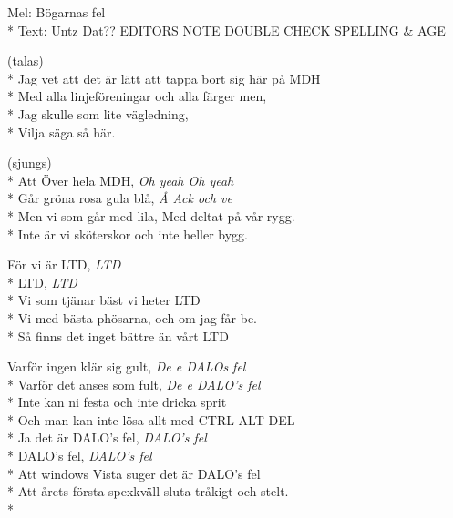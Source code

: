 \begin{SongText}
    \begin{SongInfo}
        Mel: Bögarnas fel\\*%
        Text: Untz Dat?? EDITORS NOTE DOUBLE CHECK SPELLING \& AGE
    \end{SongInfo}
    \begin{SongVerse}
        (talas)\\*%
        Jag vet att det är lätt att tappa bort sig här på MDH\\*%
        Med alla linjeföreningar och alla färger men, \\*%
        Jag skulle som lite vägledning, \\*%
        Vilja säga så här.
    \end{SongVerse}
    \begin{SongVerse}
        (sjungs)\\*%
        Att Över hela MDH, \textit{Oh yeah Oh yeah}\\*%
        Går gröna rosa gula blå, \textit{Å Ack och ve}\\*%
        Men vi som går med lila, Med deltat på vår rygg.\\*%
        Inte är vi sköterskor och inte heller bygg.
    \end{SongVerse}
    \begin{SongVerse}
        För vi är LTD, \textit{LTD}\\*%
        LTD, \textit{LTD}\\*%
        Vi som tjänar bäst vi heter LTD\\*%
        Vi med bästa phösarna, och om jag får be.\\*%
        Så finns det inget bättre än vårt LTD
    \end{SongVerse}
    \begin{SongVerse}
        Varför ingen klär sig gult, \textit{De e DALOs fel}\\*%
        Varför det anses som fult, \textit{De e DALO's fel}\\*%
        Inte kan ni festa och inte dricka sprit\\*%
        Och man kan inte lösa allt med CTRL ALT DEL\\*%
        Ja det är DALO's fel, \textit{DALO's fel} \\*%
        DALO's fel, \textit{DALO's fel}\\*%
        Att windows Vista suger det är DALO's fel\\*%
        Att årets första spexkväll sluta tråkigt och stelt.\\*%

\end{SongVerse}
\end{SongText}

